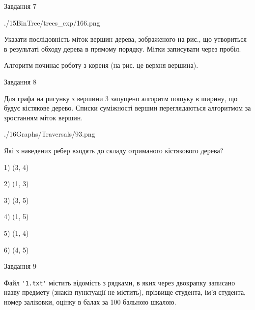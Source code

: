\documentclass[12pt, ukrainian]{article}
\def\code#1{\Verb!#1!}
\begin{document}
{\vspace{10mm}\par

\newpage
\begin{minipage}[t]{9.7cm}
               
{\begin{center}Завдання {7}\end{center}}
\vspace{-6mm}

\begin{center}
	{./15BinTree/trees_exp/166.png}
\end{center}
Указати послідовність міток вершин дерева, зображеного на рис., що утвориться в результаті обходу дерева в прямому порядку. Мітки записувати через пробіл.\par Алгоритм починає роботу з кореня (на рис. це верхня вершина).\par

\end{minipage}
\vline \hspace{8mm}
\begin{minipage}[t]{8.0cm}
               
{\begin{center}Завдання {8}\end{center}}
\vspace{-6mm}
Для графа на рисунку з вершини 3 запущено алгоритм пошуку в ширину, що будує кістякове дерево. Списки суміжності вершин переглядаються алгоритмом за зростанням міток вершин.\par
\begin{center}
	{./16Graphs/Traversals/93.png}
\end{center}
\par Які з наведених ребер входять до складу отриманого кістякового дерева?\par
1) (3, 4)\par
2) (1, 3)\par
3) (3, 5)\par
4) (1, 5)\par
5) (1, 4)\par
6) (4, 5)\par
{\vskip 15pt} \par

\end{minipage}

               
{\begin{center}Завдання {9}\end{center}}
\vspace{-6mm}
Файл \code{'1.txt'} містить відомість з рядками, в яких через двокрапку записа\-но назву предмету (знаків пунктуації не містить), прізвище студента, ім'я студента, номер залі\-ков\-ки, оцінку в балах за 100 бальною шкалою.

}
\end{document}
